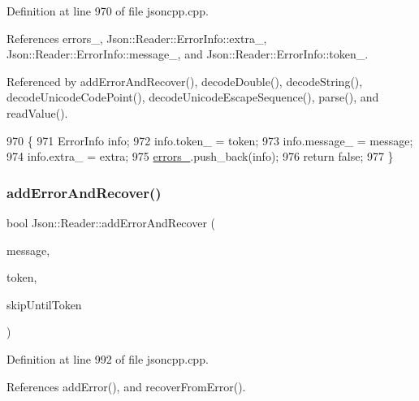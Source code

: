Definition at line 970 of file jsoncpp.\+cpp.



References errors\+\_\+, Json\+::\+Reader\+::\+Error\+Info\+::extra\+\_\+, Json\+::\+Reader\+::\+Error\+Info\+::message\+\_\+, and Json\+::\+Reader\+::\+Error\+Info\+::token\+\_\+.



Referenced by add\+Error\+And\+Recover(), decode\+Double(), decode\+String(), decode\+Unicode\+Code\+Point(), decode\+Unicode\+Escape\+Sequence(), parse(), and read\+Value().


\begin{DoxyCode}
970                                                                             \{
971   ErrorInfo info;
972   info.token\_ = token;
973   info.message\_ = message;
974   info.extra\_ = extra;
975   \hyperlink{class_json_1_1_reader_a1bbce45dc4df753bed60c129f4b5147c}{errors\_}.push\_back(info);
976   \textcolor{keywordflow}{return} \textcolor{keyword}{false};
977 \}
\end{DoxyCode}
\mbox{\label{class_json_1_1_reader_a478db8ac6d00db1409608a37b66bc38d}} 
\subsubsection{\texorpdfstring{add\+Error\+And\+Recover()}{addErrorAndRecover()}}
{\footnotesize\ttfamily bool Json\+::\+Reader\+::add\+Error\+And\+Recover (\begin{DoxyParamCaption}\item[{const \hyperlink{json_8h_a1e723f95759de062585bc4a8fd3fa4be}{J\+S\+O\+N\+C\+P\+P\+\_\+\+S\+T\+R\+I\+NG} \&}]{message,  }\item[{\hyperlink{class_json_1_1_reader_1_1_token}{Token} \&}]{token,  }\item[{\hyperlink{class_json_1_1_reader_aa35e6ab574dc399a0a645ad98ed66bc9}{Token\+Type}}]{skip\+Until\+Token }\end{DoxyParamCaption})\hspace{0.3cm}{\ttfamily [private]}}



Definition at line 992 of file jsoncpp.\+cpp.



References add\+Error(), and recover\+From\+Error().



